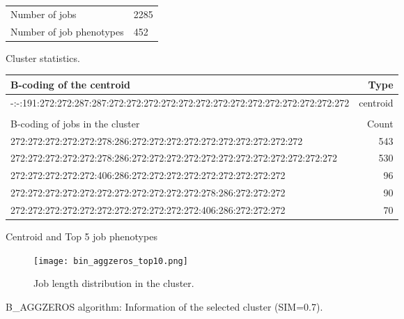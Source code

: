 \documentclass{jhps}
\begin{document}
\begin{figure}
	\begin{subtable}{\textwidth}
		\centering
		\begin{tabular}{ll}
			\centering
			Number of jobs & 2285 \\
			Number of job phenotypes & 452 \\
		\end{tabular}
		\caption{Cluster statistics.}
		\label{cluster:bin_aggzeros:stats}
	\end{subtable}
	\medskip
	\begin{subtable}{\textwidth}
		\centering
		\begin{tiny}
			\begin{tabular}{l|r}
        \rowcolor{tblhead}
        B-coding of the centroid                                                                         &  Type     \\
        \hline
        -:-:191:272:272:287:287:272:272:272:272:272:272:272:272:272:272:272:272:272:272 & centroid \\ 
        \multicolumn{2}{l}{}                                                                   \\
        \rowcolor{tblhead}
        B-coding of jobs in the cluster                                                                          &  Count    \\
        \hline
        272:272:272:272:272:278:286:272:272:272:272:272:272:272:272:272:272 & 543 \\ 
        272:272:272:272:272:278:286:272:272:272:272:272:272:272:272:272:272:272:272 & 530 \\ 
        272:272:272:272:272:406:286:272:272:272:272:272:272:272:272:272 & 96 \\ 
        272:272:272:272:272:272:272:272:272:272:272:278:286:272:272:272 & 90 \\ 
        272:272:272:272:272:272:272:272:272:272:272:406:286:272:272:272 & 70 \\
      \end{tabular}
		\end{tiny}
		\caption{Centroid and Top 5 job phenotypes}
		\label{cluster:bin_aggzeros:top_jobs}
	\end{subtable}
	\medskip
	\begin{subfigure}{\textwidth}
		\centering
		\texttt{[image: bin\_aggzeros\_top10.png]}
		\caption{Job length distribution in the cluster.}
		\label{cluster:bin_aggzeros:length}
	\end{subfigure}
	\caption{B\_AGGZEROS algorithm: Information of the selected cluster (SIM=0.7).}
	\label{cluster:bin_aggzeros}
\end{figure}
\end{document}
